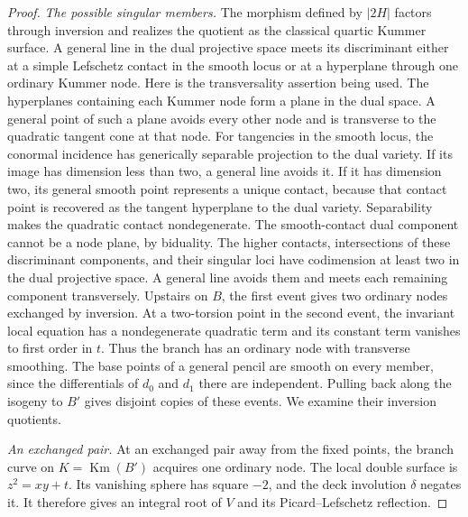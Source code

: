 \documentclass[11pt]{amsart}
\DeclareMathOperator{\Km}{Km}
\theoremstyle{definition}
\theoremstyle{remark}
\numberwithin{equation}{section}
\begin{document}
\begin{proof}
\emph{The possible singular members.}
The morphism defined by \(|2H|\) factors through inversion and realizes
the quotient as the classical quartic Kummer surface.  A general line in
the dual projective space meets its discriminant either at a simple
Lefschetz contact in the smooth locus or at a hyperplane through one
ordinary Kummer node.  Here is the transversality assertion being used.
The hyperplanes containing each Kummer node form a plane in the dual
space.  A general point of such a plane avoids every other node and is
transverse to the quadratic tangent cone at that node.  For tangencies
in the smooth locus, the conormal incidence has generically separable
projection to the dual variety.  If its image has dimension less than
two, a general line avoids it.  If it has dimension two, its general
smooth point represents a unique contact, because that contact point
is recovered as the tangent hyperplane to the dual variety.
Separability makes the quadratic contact nondegenerate.  The smooth-contact dual component cannot be a node plane, by biduality.
The higher
contacts, intersections of these discriminant components, and their
singular loci have codimension at least two in the dual projective
space.  A general line avoids them and meets each remaining component
transversely.  Upstairs on \(B\), the
first event gives two ordinary nodes exchanged by inversion.  At a
two-torsion point in the second event, the invariant local equation has
a nondegenerate quadratic term and its constant term vanishes to first
order in \(t\).  Thus the branch has an ordinary node with transverse
smoothing.  The base points of a general pencil are smooth on every
member, since the differentials of \(d_0\) and \(d_1\) there are
independent.  Pulling back along the isogeny to \(B'\) gives disjoint
copies of these events.  We examine their inversion quotients.

\emph{An exchanged pair.}
At an exchanged pair away from the fixed points, the branch curve on
\(K=\Km(B')\) acquires one ordinary node.  The local double surface is
\(z^2=xy+t\).  Its vanishing sphere has square \(-2\), and the deck
involution \(\delta\) negates it.  It therefore gives an integral root
of \(V\) and its Picard--Lefschetz reflection.


\end{proof}
\end{document}
